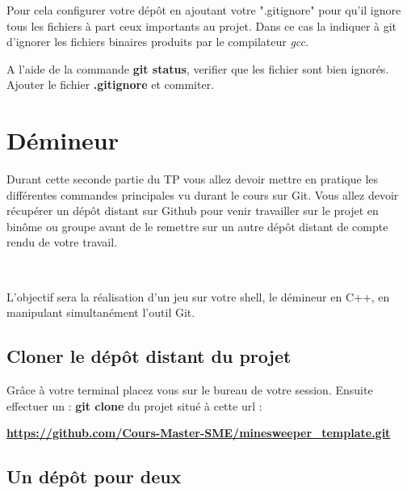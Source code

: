 Pour cela configurer votre dépôt en ajoutant votre ".gitignore" pour qu'il ignore tous les fichiers à part ceux importants au projet. Dans ce cas la indiquer à git d'ignorer les fichiers binaires produits par le compilateur \textit{gcc}.

\medskip

A l'aide de la commande \textbf{git status}, verifier que les fichier sont bien ignorés. Ajouter le fichier \textbf{.gitignore} et commiter.

\newpage 

\chapter{Démineur} 

Durant cette seconde partie du TP vous allez devoir mettre en pratique les différentes commandes principales vu durant le cours sur Git. Vous allez devoir récupérer un dépôt distant sur Github pour venir travailler sur le projet en binôme ou groupe avant de le remettre sur un autre dépôt distant de compte rendu de votre travail.

~

L'objectif sera la réalisation d'un jeu sur votre shell, le démineur en C++, en manipulant simultanément l'outil Git.

%
%
%
%
\section{Cloner le dépôt distant du projet}

Grâce à votre terminal placez vous sur le bureau de votre session. Ensuite effectuer un : \textbf{git clone} du projet situé à cette url : 

\begin{center}
    \textbf{\href{https://github.com/Cours-Master-SME/minesweeper\_template.git}{https://github.com/Cours-Master-SME/minesweeper\_template.git}}
\end{center}



\section{Un dépôt pour deux}

